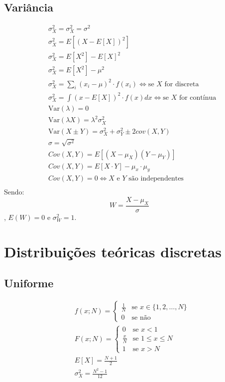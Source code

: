 \documentclass[a4paper]{article}
\begin{document}
\begin{multicols}{3}
\subsection{Variância}
\begin{align*}
  &\sigma^2_X = \sigma^2_X = \sigma^2 \\
  &\sigma^2_X = E[(X - E[X])^2] \\
  &\sigma^2_X = E[X^2] - E[X]^2 \\
  &\sigma^2_X = E[X^2] - \mu^2 \\
  &\sigma^2_X = \sum_i (x_i - \mu)^2 \cdot f(x_i) \iff \text{se } X \text{ for discreta} \\
  &\sigma^2_X = \int (x - E[X])^2 \cdot f(x) dx \iff \text{se } X \text{ for contínua} \\
  &\text{Var}(\lambda) = 0 \\
  &\text{Var}(\lambda X) = \lambda^2 \sigma^2_X \\
  &\text{Var}(X \pm Y) = \sigma^2_X + \sigma_Y^2 \pm 2 cov(X, Y) \\
  &\sigma = \sqrt{\sigma^2} \\
  &Cov(X, Y) = E[(X - \mu_X)(Y - \mu_Y)] \\
  &Cov(X, Y) = E[X \cdot Y] - \mu_x \cdot \mu_y \\
  &Cov(X, Y) = 0 \iff X \text{ e } Y \text{ são independentes} \\
\end{align*}
Sendo:
$$W = \frac{X - \mu_X}{\sigma}$$,
$E(W) = 0$ e $\sigma_W^2 = 1$.
\section{Distribuições teóricas discretas}
\subsection{Uniforme}
\begin{align*}
  &f(x; N) = \begin{cases}
    \frac{1}{N} & \text{se } x \in \{1, 2, \ldots, N\} \\
    0 & \text{se não}
  \end{cases} \\
  &F(x; N) = \begin{cases}
    0 & \text{se } x < 1 \\
    \frac{x}{N} & \text{se } 1 \leq x \leq N \\
    1 & \text{se } x > N
  \end{cases} \\
  &E[X] = \frac{N + 1}{2} \\
  &\sigma^2_X = \frac{N^2 - 1}{12}
\end{align*}

\end{multicols}
\end{document}
